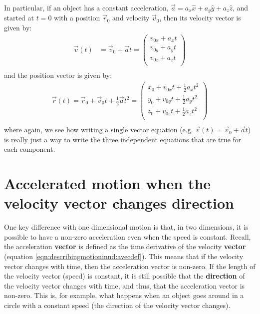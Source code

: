 In particular, if an object has a constant acceleration, $\vec a=a_x\hat x+a_y\hat y+a_z\hat z$, and started at $t=0$ with a position $\vec r_0$ and velocity $\vec v_0$, then its velocity vector is given by:
\begin{align*}
\vec v(t)  &= \vec v_0+\vec at=\begin{pmatrix}
           v_{0x}+ a_xt \\
           v_{0y}+ a_yt \\
           v_{0z}+ a_zt \\
         \end{pmatrix}\\
\end{align*}
and the position vector is given by:
\begin{align*}
\vec r(t)= \vec r_0+\vec v_0 t+\frac{1}{2}\vec a t^2=\begin{pmatrix}
           x_0+v_{0x}t+\frac{1}{2} a_xt^2 \\
           y_0+v_{0y}t+\frac{1}{2} a_yt^2 \\
           z_0+v_{0z}t+\frac{1}{2} a_zt^2 \\
         \end{pmatrix}\\
\end{align*}
where again, we see how writing a single vector equation (e.g. $\vec v(t) = \vec v_0+\vec at$) is really just a way to write the three independent equations that are true for each component.

\section{Accelerated motion when the velocity vector changes direction}
\label{sec:describingmotioninnd:accvconst}
One key difference with one dimensional motion is that, in two dimensions, it is possible to have a non-zero acceleration even when the speed is constant. Recall, the acceleration \textbf{vector} is defined as the time derivative of the velocity \textbf{vector} (equation \ref{eqn:describingmotioninnd:avecdef}). This means that if the velocity vector changes with time, then the acceleration vector is non-zero. If the length of the velocity vector (speed) is constant, it is still possible that the \textbf{direction} of the velocity vector changes with time, and thus, that the acceleration vector is non-zero. This is, for example, what happens when an object goes around in a circle with a constant speed (the direction of the velocity vector changes). 

